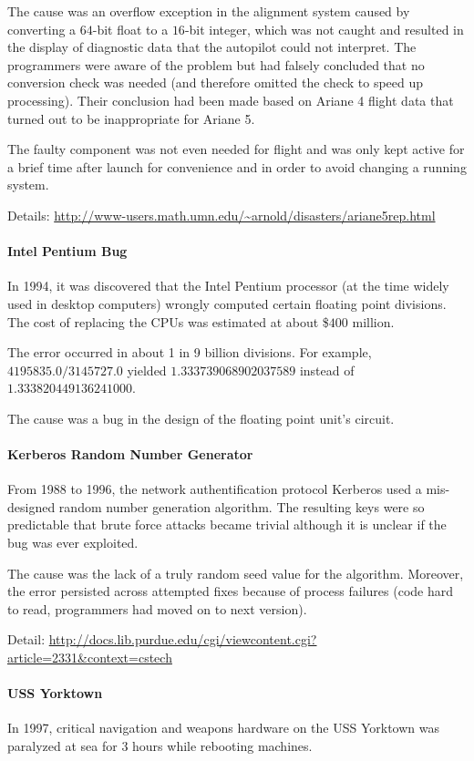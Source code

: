 The cause was an overflow exception in the alignment system caused by converting a $64$-bit float to a $16$-bit integer, which was not caught and resulted in the display of diagnostic data that the autopilot could not interpret.
The programmers were aware of the problem but had falsely concluded that no conversion check was needed (and therefore omitted the check to speed up processing).
Their conclusion had been made based on Ariane 4 flight data that turned out to be inappropriate for Ariane 5.

The faulty component was not even needed for flight and was only kept active for a brief time after launch for convenience and in order to avoid changing a running system.

Details: \url{http://www-users.math.umn.edu/~arnold/disasters/ariane5rep.html}

\paragraph{Intel Pentium Bug}
In 1994, it was discovered that the Intel Pentium processor (at the time widely used in desktop computers) wrongly computed certain floating point divisions.
The cost of replacing the CPUs was estimated at about \$$400$ million.

The error occurred in about 1 in 9 billion divisions.
For example, $4195835.0/3145727.0$ yielded $1.333 739 068 902 037 589$ instead of $1.333 820 449 136 241 000$.

The cause was a bug in the design of the floating point unit's circuit.

\paragraph{Kerberos Random Number Generator}
From 1988 to 1996, the network authentification protocol Kerberos used a mis-designed random number generation algorithm.
The resulting keys were so predictable that brute force attacks became trivial although it is unclear if the bug was ever exploited.

The cause was the lack of a truly random seed value for the algorithm.
Moreover, the error persisted across attempted fixes because of process failures (code hard to read, programmers had moved on to next version).

Detail: \url{http://docs.lib.purdue.edu/cgi/viewcontent.cgi?article=2331&context=cstech}

\paragraph{USS Yorktown}
In 1997, critical navigation and weapons hardware on the USS Yorktown was paralyzed at sea for $3$ hours while rebooting machines.

